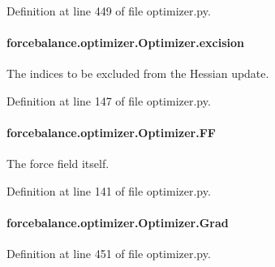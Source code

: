 Definition at line 449 of file optimizer.\-py.

\hypertarget{classforcebalance_1_1optimizer_1_1Optimizer_a1040c03a6361d782db8bd6a273d445e5}{
\paragraph[{excision}]{\setlength{\rightskip}{0pt plus 5cm}forcebalance.\-optimizer.\-Optimizer.\-excision}}\label{classforcebalance_1_1optimizer_1_1Optimizer_a1040c03a6361d782db8bd6a273d445e5}


The indices to be excluded from the Hessian update. 



Definition at line 147 of file optimizer.\-py.

\hypertarget{classforcebalance_1_1optimizer_1_1Optimizer_a873d6c3dfc5351d162613b596850af75}{
\paragraph[{F\-F}]{\setlength{\rightskip}{0pt plus 5cm}forcebalance.\-optimizer.\-Optimizer.\-F\-F}}\label{classforcebalance_1_1optimizer_1_1Optimizer_a873d6c3dfc5351d162613b596850af75}


The force field itself. 



Definition at line 141 of file optimizer.\-py.

\hypertarget{classforcebalance_1_1optimizer_1_1Optimizer_a91fbca8385133fa434eae3078e217fb6}{
\paragraph[{Grad}]{\setlength{\rightskip}{0pt plus 5cm}forcebalance.\-optimizer.\-Optimizer.\-Grad}}\label{classforcebalance_1_1optimizer_1_1Optimizer_a91fbca8385133fa434eae3078e217fb6}


Definition at line 451 of file optimizer.\-py.

